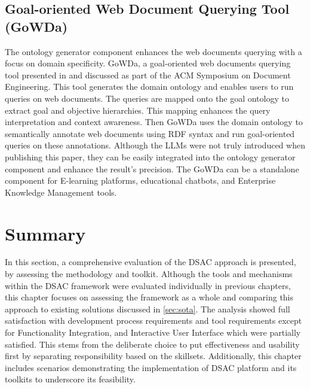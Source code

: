 \vspace{-15pt}
\hypertarget{sec:evaluation.scenario-gowda}{%
\subsection{Goal-oriented Web Document Querying Tool (GoWDa)}\label{sec:evaluation.scenario-gowda}}
\vspace{15pt}
The ontology generator component enhances the web documents querying with a focus on domain specificity. GoWDa, a goal-oriented web documents querying tool presented in \autocite{Zarei2018} and discussed as part of the ACM Symposium on Document Engineering. This tool generates the domain ontology and enables users to run queries on web documents. The queries are mapped onto the goal ontology to extract goal and objective hierarchies. This mapping enhances the query interpretation and context awareness. Then GoWDa uses the domain ontology to semantically annotate web documents using RDF syntax and run goal-oriented queries on these annotations. Although the LLMs were not truly introduced when publishing this paper, they can be easily integrated into the ontology generator component and enhance the result’s precision. The GoWDa can be a standalone component for E-learning platforms, educational chatbots, and Enterprise Knowledge Management tools.


\vspace{-15pt}
\hypertarget{sec:evaluation.summary}{%
\section{Summary}\label{sec:evaluation.summary}}
\vspace{15pt}

In this section, a comprehensive evaluation of the DSAC approach is presented, by assessing the methodology and toolkit. Although the tools and mechanisms within the DSAC framework were evaluated individually in previous chapters, this chapter focuses on assessing the framework as a whole and comparing this approach to existing solutions discussed in \cref{sec:sota}. The analysis showed full satisfaction with development process requirements and tool requirements except for Functionality Integration, and Interactive User Interface which were partially satisfied. This stems from the deliberate choice to put effectiveness and usability first by separating responsibility based on the skillsets. Additionally, this chapter includes scenarios demonstrating the implementation of DSAC platform and its toolkits to underscore its feasibility. 
